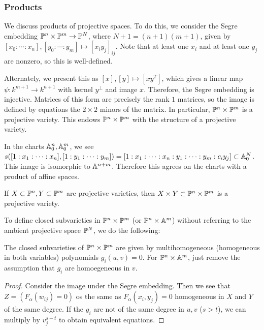 \documentclass[twoside, 10pt]{article}
\begin{document}
    \subsubsection{Products}%
    We discuss products of projective spaces. To do this, we consider the Segre embedding $\P^n \times \P^m \to \P^N$, where $N+1 = (n+1)(m+1)$, given by $[x_0:\cdots:x_n], [y_0:\cdots:y_m] \mapsto [x_iy_j]_{ij}$. Note that at least one $x_i$ and at least one $y_j$ are nonzero, so this is well-defined.

    Alternately, we present this as $[x],[y] \mapsto [xy^T]$, which gives a linear map $\psi:k^{m+1} \to k^{n+1}$ with kernel $y^{\perp}$ and image $x$. Therefore, the Segre embedding is injective. Matrices of this form are precisely the rank $1$ matrices, so the image is defined by equations the $2 \times 2$ minors of the matrix. In particular, $\P^n \times \P^m$ is a projective variety. This endows $\P^n \times \P^m$ with the structure of a projective variety.

    \begin{rmk}
        In the charts $\A^n_0, \A^m_0$, we see $s([1:x_1:\cdots:x_n],[1:y_1:\cdots:y_m]) = [1:x_1:\cdots:x_n:y_1:\cdots:y_m:c_iy_j] \subset \A_0^N$. This image is isomorphic to $\A^{n+m}$. Therefore this agrees on the charts with a product of affine spaces.
    \end{rmk}

    If $X \subset \P^n, Y \subset \P^m$ are projective varieties, then $X \times Y \subset \P^n \times \P^m$ is a projective variety.

    To define closed subvarieties in $\P^n \times \P^m$ (or $\P^n \times \A^m$) without referring to the ambient projective space $\P^N$, we do the following:

    \begin{thm}
        The closed subvarieties of $\P^n \times \P^m$ are given by multihomogeneous (homogeneous in both variables) polynomials $g_i(u,v) = 0$. For $\P^n \times \A^m$, just remove the assumption that $g_i$ are homoegeneous in $v$.
        \begin{proof}
            Consider the image under the Segre embedding. Then we see that $Z = (F_{\alpha}(w_{ij}) = 0)$ os the same as $F_{\alpha}(x_i,y_j) = 0$ homogeneous in $X$ and $Y$ of the same degree. If the $g_i$ are not of the same degree in $u,v$ ($s>t$), we can multiply by $v_j^{s-t}$ to obtain equivalent equations.
        \end{proof}
    \end{thm}
\end{document}
